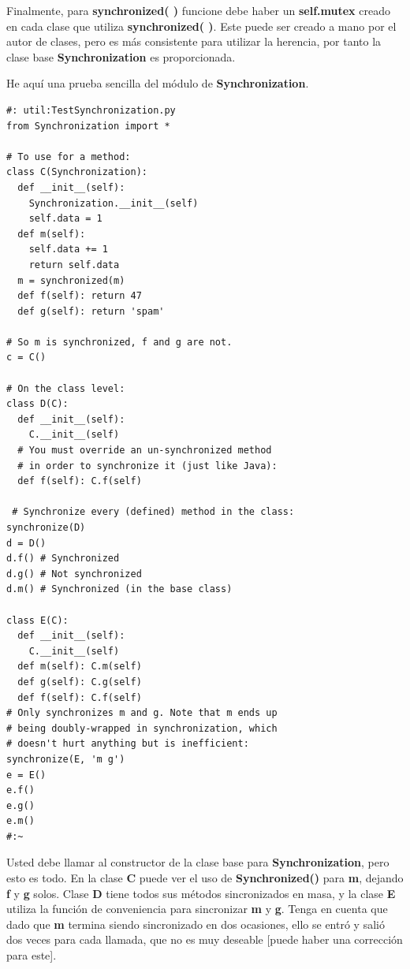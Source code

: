 \documentclass{article}
\begin{document}
Finalmente, para \textbf{synchronized( )} funcione debe haber un \textbf{self.mutex} creado en cada clase que utiliza \textbf{synchronized( )}. Este puede ser creado a mano por el autor de clases, pero es más consistente para utilizar la herencia, por tanto la clase base \textbf{Synchronization} es proporcionada.  \newline

He aquí una prueba sencilla del módulo de \textbf{Synchronization}. \newline

\begin{lstlisting} 
#: util:TestSynchronization.py 
from Synchronization import *  

# To use for a method: 
class C(Synchronization): 
  def __init__(self): 
    Synchronization.__init__(self) 
    self.data = 1 
  def m(self): 
    self.data += 1 
    return self.data 
  m = synchronized(m) 
  def f(self): return 47 
  def g(self): return 'spam'
  
# So m is synchronized, f and g are not. 
c = C() 

# On the class level: 
class D(C): 
  def __init__(self): 
    C.__init__(self) 
  # You must override an un-synchronized method 
  # in order to synchronize it (just like Java): 
  def f(self): C.f(self) 
  
 # Synchronize every (defined) method in the class: 
synchronize(D) 
d = D() 
d.f() # Synchronized 
d.g() # Not synchronized 
d.m() # Synchronized (in the base class) 

class E(C): 
  def __init__(self): 
    C.__init__(self) 
  def m(self): C.m(self) 
  def g(self): C.g(self) 
  def f(self): C.f(self) 
# Only synchronizes m and g. Note that m ends up 
# being doubly-wrapped in synchronization, which 
# doesn't hurt anything but is inefficient: 
synchronize(E, 'm g') 
e = E() 
e.f() 
e.g() 
e.m() 
#:~
\end{lstlisting}

Usted debe llamar al constructor de la clase base para \textbf{Synchronization}, pero esto es todo. En la clase \textbf{C} puede ver el uso de \textbf{Synchronized()} para \textbf{m}, dejando \textbf{f} y \textbf{g} solos. Clase \textbf{D} tiene todos sus métodos sincronizados en masa, y la clase \textbf{E} utiliza la función de conveniencia para sincronizar \textbf{m} y \textbf{g}. Tenga en cuenta que dado que \textbf{m} termina siendo sincronizado en dos ocasiones, ello se entró y salió dos veces para cada llamada, que no es muy deseable [puede haber una corrección para este].     \newline
      
\end{document}
